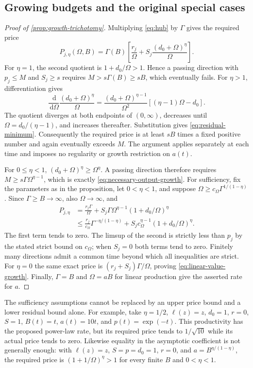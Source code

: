 \documentclass[11pt,a4paper]{article}
\theoremstyle{definition}\newtheorem{definition}{Definition}
\newcommand{\dd}{\,\mathrm{d}}
\begin{document}
\subsection{Growing budgets and the original special cases}
\label{app:growth-proof}
\begin{proof}[Proof of \cref{prop:growth-trichotomy}]
Multiplying \cref{eq:hub} by $\Gamma$ gives the required price
\[
 P_{j,\eta}(\Omega,B)=\Gamma(B)
 \left[\frac{r_j}{\Omega}
       +S_j\frac{(d_0+\Omega)^\eta}{\Omega}\right].
\]
For $\eta=1$, the second quotient is $1+d_0/\Omega>1$.
Hence a passing direction with $p_j\leq M$ and $S_j\geq s$ requires
$M>s\Gamma(B)\geq sB$, which eventually fails.
For $\eta>1$, differentiation gives
\[
 \frac{\dd}{\dd\Omega}\frac{(d_0+\Omega)^\eta}{\Omega}
 =\frac{(d_0+\Omega)^{\eta-1}}{\Omega^2}
       [(\eta-1)\Omega-d_0].
\]
The quotient diverges at both endpoints of $(0,\infty)$, decreases
until $\Omega=d_0/(\eta-1)$, and increases thereafter. Substitution
gives \cref{eq:residual-minimum}. Consequently the required price is
at least $sB$ times a fixed positive number and again eventually exceeds
$M$. The argument applies separately at each time and imposes no
regularity or growth restriction on $a(t)$.

For $0\leq\eta<1$, $(d_0+\Omega)^\eta\geq\Omega^\eta$.
A passing direction therefore requires
$M\geq s\Gamma\Omega^{\eta-1}$, which is exactly
\cref{eq:necessary-output-growth}. For sufficiency, fix the parameters
as in the proposition, let $0<\eta<1$, and suppose
$\Omega\geq c_\Omega\Gamma^{1/(1-\eta)}$. Since
$\Gamma\geq B\to\infty$, also $\Omega\to\infty$, and
\begin{align*}
 P_{j,\eta}
 &=\frac{r_j\Gamma}{\Omega}
   +S_j\Gamma\Omega^{\eta-1}(1+d_0/\Omega)^\eta\\
 &\leq\frac{r_j}{c_\Omega}\Gamma^{-\eta/(1-\eta)}
   +S_jc_\Omega^{\eta-1}(1+d_0/\Omega)^\eta.
\end{align*}
The first term tends to zero. The limsup of the second is strictly
less than $p_j$ by the stated strict bound on $c_\Omega$; when $S_j=0$
both terms tend to zero. Finitely many directions admit a common time
beyond which all inequalities are strict. For $\eta=0$ the same exact
price is $(r_j+S_j)\Gamma/\Omega$, proving
\cref{eq:linear-value-growth}. Finally, $\Gamma=B$ and $\Omega=aB$
for linear production give the asserted rate for $a$.
\end{proof}

The sufficiency assumptions cannot be replaced by an upper price bound
and a lower residual bound alone. For example, take $\eta=1/2$,
$\ell(z)=z$, $d_0=1$, $r=0$, $S=1$, $B(t)=t$, $a(t)=10t$,
and $p(t)=\exp(-t)$. This productivity has the proposed power-law rate,
but its required price tends to $1/\sqrt{10}$ while its actual price
tends to zero. Likewise equality in the asymptotic coefficient is not
generally enough: with $\ell(z)=z$, $S=p=d_0=1$, $r=0$, and
$a=B^{\eta/(1-\eta)}$, the required price is
$(1+1/\Omega)^\eta>1$ for every finite $B$ and $0<\eta<1$.
\end{document}
